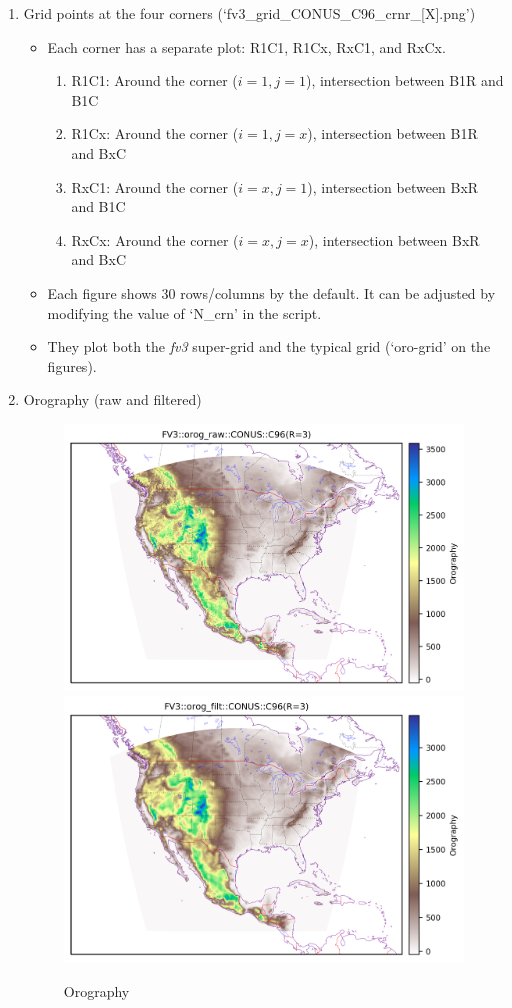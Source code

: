 \documentclass[11pt,fleqn]{report}              %
\begin{document}
\begin{enumerate}
\begin{enumerate}
\item Grid points at the four corners  (`fv3\_grid\_CONUS\_C96\_crnr\_[X].png')
\begin{itemize}
\item Each corner has a separate plot: R1C1, R1Cx, RxC1, and RxCx.
\begin{enumerate}
\item R1C1: Around the corner ($i=1, j=1$), intersection between B1R and B1C
\item R1Cx: Around the corner ($i=1, j=x$), intersection between B1R and BxC
\item RxC1: Around the corner ($i=x, j=1$), intersection between BxR and B1C
\item RxCx: Around the corner ($i=x, j=x$), intersection between BxR and BxC
\end{enumerate}
\item Each figure shows 30 rows/columns by the default. It can be adjusted by modifying the value of `N\_crn' in the script. 
\item They plot both the {\it fv3} super-grid and the typical grid (`oro-grid' on the figures).
\end{itemize}


\item Orography (raw and filtered)

\begin{figure}[ht!]
  \centering
  \includegraphics[width=0.48\linewidth]{fv3_orog_CONUS_C96_orog_raw.png}
  \includegraphics[width=0.48\linewidth]{fv3_orog_CONUS_C96_orog_filt.png}
  \caption{Orography}
  \label{fig:py_orog}
\end{figure}



\end{enumerate}
\end{enumerate}
\end{document}
